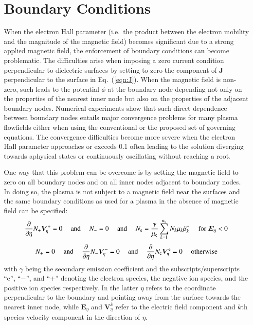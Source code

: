 \documentclass{warpdoc}
\newcommand{\ns}{{n_{\rm s}}}
\renewcommand{\vec}[1]{\bm{#1}}
\begin{document}
	


\section{Boundary Conditions}


When the electron Hall parameter (i.e.\ the product between the electron mobility and the magnitude of the magnetic field) becomes significant due to a strong applied magnetic field, the enforcement of boundary conditions can become problematic. The difficulties arise when imposing a zero current condition perpendicular to dielectric surfaces by setting to zero the component of $\vec{J}$ perpendicular to the surface in Eq.\ (\ref{eqn:J}). When the magnetic field is non-zero, such leads to the potential $\phi$ at the boundary node depending not only on the properties of the nearest inner node but also on the properties of the adjacent boundary nodes. Numerical experiments show that such direct dependence between boundary nodes entails major convergence problems for many plasma flowfields either when using the conventional or the proposed set of governing equations. The convergence difficulties become more severe when the electron Hall parameter approaches or exceeds 0.1 often leading to the solution diverging towards aphysical states or continuously oscillating without reaching a root. 

One way that this problem can be overcome is by setting the magnetic field to zero on all boundary nodes and on all inner nodes adjacent to boundary nodes. In doing so, the plasma is not subject to a magnetic field near the surfaces and the same boundary conditions as used for a plasma in the absence of magnetic field can be specified:
%
\begin{equation}
\frac{\partial }{\partial \eta} N_+ \vec{V}^{+}_\eta = 0
{~~~~~\rm and~~~~~}
N_{-}=0
{~~~~~\rm and~~~~~}
N_{\rm e}=\frac{\gamma}{\mu_{\rm e}} \sum_{k=1}^\ns N_k \mu_k \beta_k^+
{~~~~~\rm for~}
\vec{E}_\eta<0
\end{equation}
%
%
\begin{equation}
N_{+}=0
{~~~~~\rm and~~~~~}
\frac{\partial }{\partial \eta} N_- \vec{V}^{-}_\eta = 0
{~~~~~\rm and~~~~~}
\frac{\partial }{\partial \eta} N_{\rm e} \vec{V}^{\rm e}_\eta= 0
{~~~~~\rm otherwise} 
\end{equation}
%
with $\gamma$ being the secondary emission coefficient and the subscripts/superscripts ``e'', ``$-$'', and ``$+$'' denoting the electron species, the negative ion species, and the positive ion species respectively. In the latter $\eta$ refers to the coordinate perpendicular to the boundary and pointing away from the surface towards the nearest inner node, while  $\vec{E}_\eta$ and $\vec{V}^k_\eta$ refer to the electric field component and $k$th species velocity component in the direction of $\eta$.   
\end{document}
